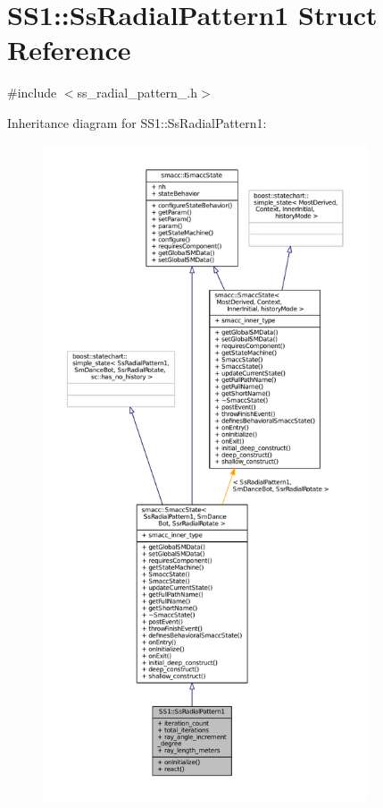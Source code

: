\hypertarget{structSS1_1_1SsRadialPattern1}{}\section{S\+S1\+:\+:Ss\+Radial\+Pattern1 Struct Reference}
\label{structSS1_1_1SsRadialPattern1}


{\ttfamily \#include $<$ss\+\_\+radial\+\_\+pattern\+\_.\+h$>$}



Inheritance diagram for S\+S1\+:\+:Ss\+Radial\+Pattern1\+:
\nopagebreak
\begin{figure}[H]
\begin{center}
\leavevmode
\includegraphics[height=550pt]{structSS1_1_1SsRadialPattern1__inherit__graph}
\end{center}
\end{figure}


